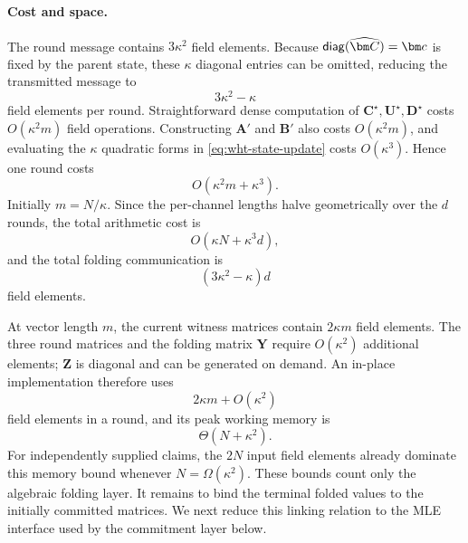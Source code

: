 \documentclass[runningheads]{llncs}
\begin{document}
\paragraph{Cost and space.}
The round message contains \(3\kappa^2\) field elements.  Because
\(\diag(\widehat{\bm C})=\bm c\) is fixed by the parent state, these
\(\kappa\) diagonal entries can be omitted, reducing the transmitted
message to
\[
    3\kappa^2-\kappa
\]
field elements per round.  Straightforward dense computation of
\(\bm C^\star,\bm U^\star,\bm D^\star\) costs
\(O(\kappa^2m)\) field operations.  Constructing
\(\bm A'\) and \(\bm B'\) also costs \(O(\kappa^2m)\), and evaluating
the \(\kappa\) quadratic forms in \eqref{eq:wht-state-update} costs
\(O(\kappa^3)\).  Hence one round costs
\[
    O\left(\kappa^2m+\kappa^3\right).
\]
Initially \(m=N/\kappa\).  Since the per-channel lengths halve
geometrically over the \(d\) rounds, the total
arithmetic cost is
\[
    O\left(
      \kappa N+\kappa^3d
    \right),
\]
and the total folding communication is
\[
    (3\kappa^2-\kappa)d
\]
field elements.

At vector length \(m\), the current witness matrices contain
\(2\kappa m\) field elements.  The three round matrices and the
folding matrix \(\bm Y\) require \(O(\kappa^2)\) additional elements;
\(\bm Z\) is diagonal and can be generated on demand.  An in-place
implementation therefore uses
\[
    2\kappa m+O(\kappa^2)
\]
field elements in a round, and its peak working memory is
\[
    \Theta\!\left(N+\kappa^2\right).
\]
For independently supplied claims, the \(2N\) input field elements
already dominate this memory bound whenever \(N=\Omega(\kappa^2)\).
These bounds count only the algebraic folding layer.  It remains to
bind the terminal folded values to the initially committed matrices.
We next reduce this linking relation to the MLE interface used by the
commitment layer below.
\end{document}
